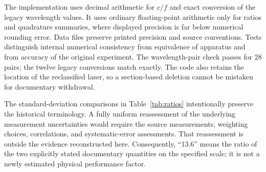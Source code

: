 \documentclass[11pt,a4paper]{article}
\begin{document}
The implementation uses decimal arithmetic for $c/f$ and exact conversion of the legacy wavelength values. It uses ordinary floating-point arithmetic only for ratios and quadrature summaries, where displayed precision is far below numerical rounding error. Data files preserve printed precision and source conventions. Tests distinguish internal numerical consistency from equivalence of apparatus and from accuracy of the original experiment. The wavelength-pair check passes for 28 pairs; the twelve legacy conversions match exactly. The code also retains the location of the reclassified laser, so a section-based deletion cannot be mistaken for documentary withdrawal.

The standard-deviation comparisons in Table~\ref{tab:ratios} intentionally preserve the historical terminology. A fully uniform reassessment of the underlying measurement uncertainties would require the source measurements, weighting choices, correlations, and systematic-error assessments. That reassessment is outside the evidence reconstructed here. Consequently, ``13.6'' means the ratio of the two explicitly stated documentary quantities on the specified scale; it is not a newly estimated physical performance factor.
\end{document}
